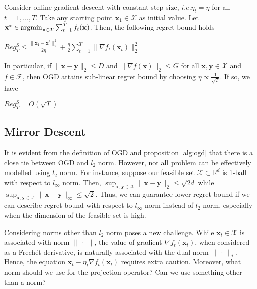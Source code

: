 \documentclass[12pt, a4paper]{report}
\begin{document}
\begin{prop} \label{prop:ogd-bound}
Consider online gradient descent with constant step size, $i.e. \eta_t = \eta$ for all $t = 1, \dots, T$. Take any starting point $\mathbf{x}_1 \in \mathcal{X}$ as initial value. Let $\mathbf{x}^{*} \in \operatorname*{argmin}_{\mathbf{x} \in \mathcal{X}} \sum_{t=1}^{T} f_t(\mathbf{x})$. Then, the following regret bound holds 
\begin{center}
    $\displaystyle Reg_T^S \leq \frac{\lVert \mathbf{x}_1 - \mathbf{x}^{*} \rVert_2^2}{2\eta} + \frac{\eta}{2}\sum_{t=1}^{T} \lVert \nabla f_t(\mathbf{x}_t) \rVert_2^2$
\end{center}
In particular, if $\lVert \mathbf{x} - \mathbf{y} \rVert_2 \leq D$ and $\lVert \nabla f(\mathbf{x}) \rVert_2 \leq G$ for all $\mathbf{x}, \mathbf{y} \in \mathcal{X}$ and $f \in \mathcal{F}$, then OGD attains sub-linear regret bound by choosing $\eta \propto \frac{1}{\sqrt{T}}$. If so, we have
\begin{center}
    $Reg_T^S = O(\sqrt{T})$
\end{center}
\end{prop}

\subsection{Mirror Descent}

It is evident from the definition of OGD and proposition \ref{alg:ogd} that there is a close tie between OGD and $l_2$ norm.
However, not all problem can be effectively modelled using $l_2$ norm. For instance, suppose our feasible set $\mathcal{X} \subset \mathbb{R}^d$ is 1-ball with respect to $l_\infty$ norm. Then, $\sup_{\mathbf{x}, \mathbf{y} \in \mathcal{X}} \lVert \mathbf{x} - \mathbf{y} \rVert_2 \leq \sqrt{2d}$ while $\sup_{\mathbf{x}, \mathbf{y} \in \mathcal{X}} \lVert \mathbf{x} - \mathbf{y} \rVert_{\infty} \leq \sqrt{2}$. Thus, we can guarantee lower regret bound if we can describe regret bound with respect to $l_\infty$ norm instead of $l_2$ norm, especially when the dimension of the feasible set is high.

Considering norms other than $l_2$ norm poses a new challenge. While $\mathbf{x}_t \in \mathcal{X}$ is associated with norm $\lVert\ \cdot\ \rVert$, the value of gradient $\nabla f_t(\mathbf{x}_t)$, when considered as a Frech\'et derivative, is naturally associated with the dual norm $\lVert\ \cdot\ \rVert_{*}$. Hence, the equation $\mathbf{x}_t - \eta_t \nabla f_t(\mathbf{x}_t)$ requires extra caution. Moreover, what norm should we use for the projection operator? Can we use something other than a norm?
\end{document}
